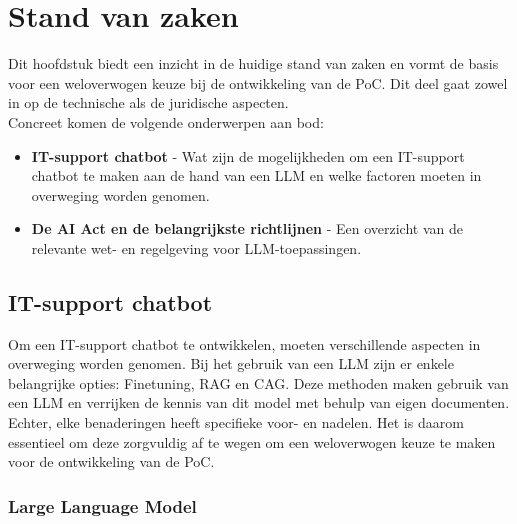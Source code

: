 \chapter{Stand van zaken}
\label{ch:stand-van-zaken}


Dit hoofdstuk biedt een inzicht in de huidige stand van zaken en vormt de basis voor een weloverwogen keuze bij de ontwikkeling van de PoC. Dit deel gaat zowel in op de technische als de juridische aspecten.
\\[1em]
Concreet komen de volgende onderwerpen aan bod:
\begin{itemize}
    \item \textbf{IT-support chatbot} - Wat zijn de mogelijkheden om een IT-support chatbot te maken aan de hand van een LLM en welke factoren moeten in overweging worden genomen.
    \item \textbf{De AI Act en de belangrijkste richtlijnen} - Een overzicht van de relevante wet- en regelgeving voor LLM-toepassingen.
\end{itemize}

\section{IT-support chatbot}

Om een IT-support chatbot te ontwikkelen, moeten verschillende aspecten in overweging worden genomen. Bij het gebruik van een LLM zijn er enkele belangrijke opties: Finetuning, RAG en CAG. Deze methoden maken gebruik van een LLM en verrijken de kennis van dit model met behulp van eigen documenten. Echter, elke benaderingen heeft specifieke voor- en nadelen. Het is daarom essentieel om deze zorgvuldig af te wegen om een weloverwogen keuze te maken voor de ontwikkeling van de PoC.

\subsection{Large Language Model}
    
